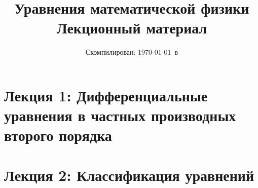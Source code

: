 \documentclass[a4paper,12pt]{extarticle}
\date{Скомпилирован: \today\ в \currenttime \\ \compilerinfo}
\begin{document}
\title{Уравнения математической физики\\Лекционный материал}
\maketitle

\tableofcontents
\break

\section{Лекция 1: Дифференциальные уравнения в частных производных второго порядка}


\section{Лекция 2: Классификация уравнений}

\end{document}
